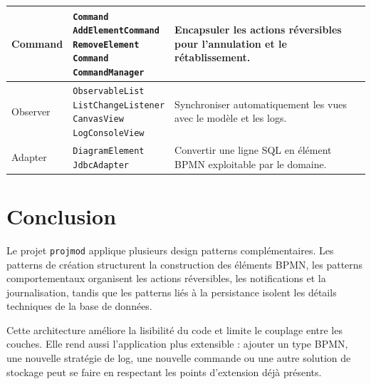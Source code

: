 \documentclass[12pt,a4paper]{article}
\makeatletter
\newcommand{\classlist}[1]{%
    \begin{tabular}[t]{@{}l@{}}#1\end{tabular}%
}
\makeatother
\begin{document}
\begin{longtable}{|>{\raggedright\arraybackslash}p{2.6cm}|>{\raggedright\arraybackslash}p{4.8cm}|>{\raggedright\arraybackslash}p{6.7cm}|}
\hline
Command &
\classlist{\texttt{Command}\\ \texttt{AddElementCommand}\\ \texttt{RemoveElement}\\ \texttt{Command}\\ \texttt{CommandManager}} &
Encapsuler les actions réversibles pour l'annulation et le rétablissement. \\
\hline
Observer &
\classlist{\texttt{ObservableList}\\ \texttt{ListChangeListener}\\ \texttt{CanvasView}\\ \texttt{LogConsoleView}} &
Synchroniser automatiquement les vues avec le modèle et les logs. \\
\hline
Adapter &
\classlist{\texttt{DiagramElement}\\ \texttt{JdbcAdapter}} &
Convertir une ligne SQL en élément BPMN exploitable par le domaine. \\
\hline
\end{longtable}
\endgroup

\section{Conclusion}

Le projet \texttt{projmod} applique plusieurs design patterns complémentaires. Les patterns de création structurent la construction des éléments BPMN, les patterns comportementaux organisent les actions réversibles, les notifications et la journalisation, tandis que les patterns liés à la persistance isolent les détails techniques de la base de données.

Cette architecture améliore la lisibilité du code et limite le couplage entre les couches. Elle rend aussi l'application plus extensible : ajouter un type BPMN, une nouvelle stratégie de log, une nouvelle commande ou une autre solution de stockage peut se faire en respectant les points d'extension déjà présents.
\end{document}
